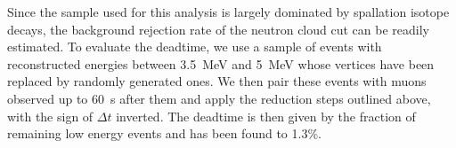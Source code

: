 Since the sample used for this analysis is largely dominated by spallation isotope decays, the background rejection rate of the neutron cloud cut can be readily estimated. To evaluate the deadtime, we use a sample of events with reconstructed energies between 3.5~MeV and 5~MeV whose vertices have been replaced by randomly generated ones. We then pair these events with muons observed up to 60~s after them and apply the reduction steps outlined above, with the sign of $\Delta t$ inverted. The deadtime is then given by the fraction of remaining low energy events and has been found to 1.3\%. 
 
